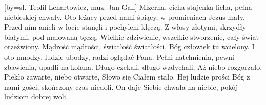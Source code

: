 [by={sł. Teofil Lenartowicz, muz. Jan Gall}]
\beginverse
Mizerna, cicha stajenka licha,
pełna niebieskiej chwały.
Oto leżący przed nami śpiący,
w promieniach Jezus mały.
\endverse
\beginverse
Przed nim anieli w locie stanęli
i pochyleni klęczą.
Z włosy złotymi, skrzydły białymi,
pod malowaną tęczą.
\endverse
\beginverse
Wielkie zdziwienie, wszelkie stworzenie,
cały świat orzeźwiony.
Mądrość mądrości, światłość światłości,
Bóg człowiek tu wcielony.
\endverse
\beginverse
I oto mnodzy, ludzie ubodzy,
radzi oglądać Pana.
Pełni natchnienia, pewni zbawienia,
upadli na kolana.
\endverse
\beginverse
Długo czekali, długo wzdychali,
Aż niebo rozgorzało,
Piekło zawarte, niebo otwarte,
Słowo się Ciałem stało.
\endverse
\beginverse
Hej ludzie prości Bóg z nami gości,
skończony czas niedoli.
On daje Siebie chwała na niebie,
pokój ludziom dobrej woli.
\endverse
\endsong